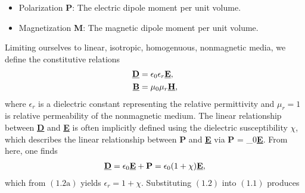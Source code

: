 \begin{itemize}
\item Polarization \textbf{P}: The electric dipole moment per unit volume.
\item  Magnetization \textbf{M}: The magnetic dipole moment per unit volume.
\end{itemize}
Limiting ourselves to linear, isotropic, homogenuous, nonmagnetic media, we define the constitutive relations
\begin{subequations}
\begin{align}
\textbf{\underline{D}}&= \epsilon_0\epsilon_r\textbf{\underline{E}},\\
\textbf{\underline{B}}&= \mu_0\mu_r\textbf{\underline{H}},
\end{align}
\end{subequations}
where $\epsilon_r$ is a dielectric constant representing the relative permittivity and $\mu_r = 1$ is relative
permeability of the nonmagnetic medium. The linear relationship between \textbf{\underline{D}} and \textbf{\underline{E}} is often implicitly defined using the dielectric susceptibility $\chi$, which describes the linear relationship between \textbf{P} and \textbf{\underline{E}} via
\bes
\textbf{P} = \epsilon_0\chi\textbf{\underline{E}}.
\ees
From here, one finds
\begin{align*}
\textbf{\underline{D}} = \epsilon_0\textbf{\underline{E}} + \textbf{P} = \epsilon_0(1+\chi)\textbf{\underline{E}},
\end{align*}
which from $(1.2\text{a})$ yields $\epsilon_r = 1+\chi.$ Substituting $(1.2)$ into $(1.1)$ produces

